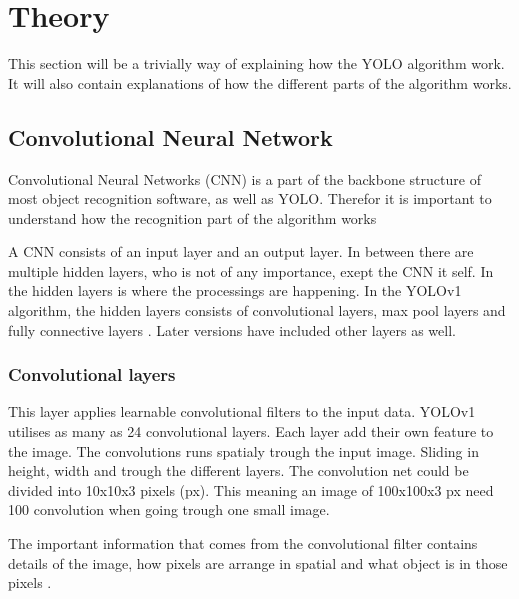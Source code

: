 \newpage

\section{Theory}

This section will be a trivially way of explaining how the YOLO algorithm work. It will also contain explanations of how the different parts of the algorithm works.

\subsection{Convolutional Neural Network}
Convolutional Neural Networks (CNN) is a part of the backbone structure of most object recognition software, as well as YOLO. Therefor it is important to understand how the recognition part of the algorithm works

A CNN consists of an input layer and an output layer. In between there are multiple hidden layers, who is not of any importance, exept the CNN it self. In the hidden layers is where the processings are happening. In the YOLOv1 algorithm, the hidden layers consists of convolutional layers, max pool layers and fully connective layers \cite{YOLO}. Later versions have included other layers as well.\cite{YOLOv3}


\subsubsection{Convolutional layers}
This layer applies learnable convolutional filters to the input data. YOLOv1 utilises as many as 24 convolutional layers. Each layer add their own feature to the image. The convolutions runs spatialy trough the input image. Sliding in height, width and trough the different layers. The convolution net could be divided into 10x10x3 pixels (px). This meaning an image of 100x100x3 px need 100 convolution when going trough one small image. 

The important information that comes from the convolutional filter contains details of the image, how pixels are arrange in spatial and what object is in those pixels \cite{SF_ConvNet}.

